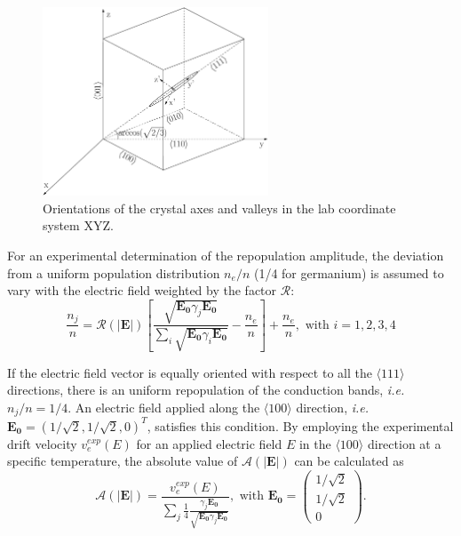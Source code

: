 \begin{figure}[tbhp]
  \centering
  \includegraphics[width=0.6\textwidth]{axes.eps}  
  \caption{Orientations of the crystal axes and valleys in the lab coordinate system XYZ.}
  \label{fig:axes}
\end{figure}

For an experimental determination of the repopulation amplitude, the deviation from a uniform population distribution $n_{e}/n$ (1/4 for germanium) is assumed to vary with the electric field weighted by the factor $\mathcal{R}$:
\begin{equation}
  \label{eq:nion}
  \frac{n_{j}}{n} = \mathcal{R(|\mathbf{E}|)}   \left[         \frac{\sqrt{\mathbf{E_{0}}\gamma_{j}\mathbf{E_{0}}}}
    {\sum_{i}\sqrt{\mathbf{E_{0}}\gamma_{i}\mathbf{E_{0}}}} -               \frac{n_{e}}{n} \right] + \frac{n_{e}}{n},  \mbox{ with }           i=1,2,3,4
\end{equation}

If the electric field vector is equally oriented with respect to all the $\langle111\rangle$ directions, there is an uniform repopulation of the conduction bands, \textit{i.e.} $n_{j}/n = 1/4$. An electric field applied along the $\langle100\rangle$ direction, \textit{i.e.} $\mathbf{E_{0}} = (1/\sqrt{2},1/\sqrt{2},0)^{T}$, satisfies this condition. By employing the experimental drift velocity $v_{e}^{exp}(E)$ for an applied electric field $E$ in the $\langle100\rangle$ direction at a specific temperature, the absolute value  of $\mathcal{A}(|\mathbf{E}|)$ can be calculated as
\begin{equation}
  \label{eq:ae}
  \mathcal{A}(|\mathbf{E}|) = \frac{v_{e}^{exp}(E)}  {\displaystyle \sum_{j}     \frac{1}{4}     \frac{\gamma_{j}\mathbf{E_{0}}}         {\sqrt{\mathbf{E_{0}}\gamma_{j}\mathbf{E_{0}}}} },  \mbox{ with }       \mathbf{E_{0}} = \left( \begin{array}{c} 
    1/\sqrt{2}\\1/\sqrt{2}\\0 \end{array} \right).
\end{equation}

